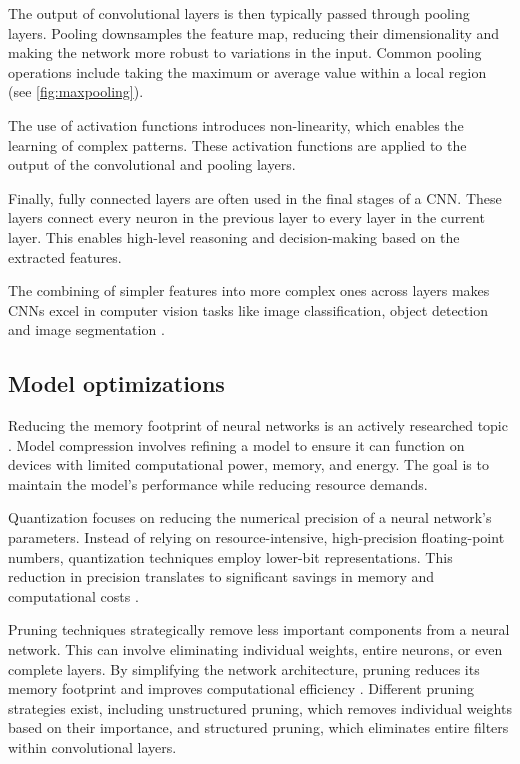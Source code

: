 The output of convolutional layers is then typically passed through pooling layers.
Pooling downsamples the feature map, reducing their dimensionality and making the network more robust to variations in the input.
Common pooling operations include taking the maximum or average value within a local region (see \cref{fig:maxpooling}). 

The use of activation functions introduces non-linearity, which enables the learning of complex patterns.
These activation functions are applied to the output of the convolutional and pooling layers.

Finally, fully connected layers are often used in the final stages of a CNN.
These layers connect every neuron in the previous layer to every layer in the current layer.
This enables high-level reasoning and decision-making based on the extracted features.

The combining of simpler features into more complex ones across layers makes CNNs excel in computer vision tasks like image classification, object detection and image segmentation \cite{krizhevskyImageNetClassificationDeep2017}.

\subsection{Model optimizations}
Reducing the memory footprint of neural networks is an actively researched topic \cite{neillOverviewNeuralNetwork2020, leEfficientNeuralNetworks2023}.
Model compression involves refining a model to ensure it can function on devices with limited computational power, memory, and energy.
The goal is to maintain the model's performance while reducing resource demands.

Quantization focuses on reducing the numerical precision of a neural network's parameters.
Instead of relying on resource-intensive, high-precision floating-point numbers, quantization techniques employ lower-bit representations.
This reduction in precision translates to significant savings in memory and computational costs \autocite{guoSurveyMethodsTheories2018}.

Pruning techniques strategically remove less important components from a neural network.
This can involve eliminating individual weights, entire neurons, or even complete layers.
By simplifying the network architecture, pruning reduces its memory footprint and improves computational efficiency \cite{blalockWhatStateNeural2020}.
Different pruning strategies exist, including unstructured pruning, which removes individual weights based on their importance, and structured pruning, which eliminates entire filters within convolutional layers.

